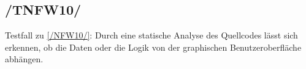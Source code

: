 \subsection*{/TNFW10/}

\label{/TNFW10/} Testfall zu \ref{/NFW10/}: Durch eine \gls{statische Analyse} des \Gls{Quellcode}s lässt sich erkennen, ob die Daten oder die Logik von der graphischen Benutzeroberfläche abhängen.